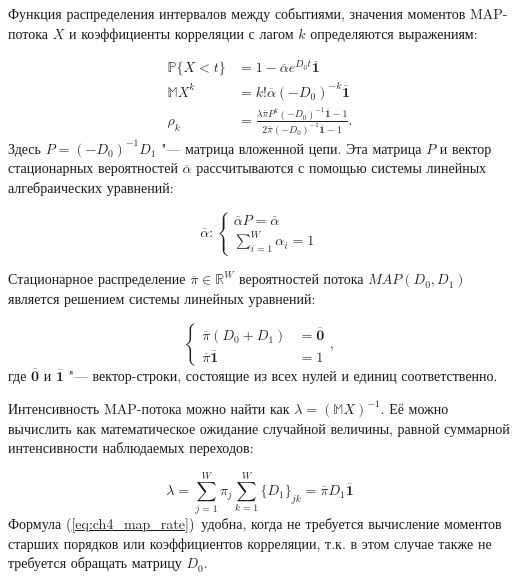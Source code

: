 Функция распределения интервалов между событиями, значения моментов MAP-потока $X$ и коэффициенты корреляции с лагом $k$ определяются выражениям:

\begin{equation}
	\label{eq:ch4_map_props}
    \begin{aligned}
    \mathbb{P}\{X < t\} &= 1 - \overline{\alpha}e^{D_0 t}\overline{\mathbf{1}}\\
    \mathbb{M}X^{k} &= k! \overline{\alpha}(-D_0)^{-k}\overline{\mathbf{1}}\\
    \rho_k &= \frac{\lambda \overline{\pi} P^k (-D_0)^{-1} \overline{\mathbf{1}} - 1}{2 \overline{\pi} (-D_0)^{-1} \overline{\mathbf{1}} - 1}.
    \end{aligned}
\end{equation}
Здесь $P = (-D_0)^{-1} D_1$ "--- матрица вложенной цепи. Эта матрица $P$ и вектор стационарных вероятностей $\overline{\alpha}$ рассчитываются с помощью системы линейных алгебраических уравнений:

\begin{equation}
\label{eq:ch4_map_dtmc}
	\overline{\alpha}: \begin{cases}
		\overline{\alpha} P = \overline{\alpha} \\
		\sum\limits_{i=1}^{W} \alpha_i = 1
 	\end{cases}
\end{equation}

Стационарное распределение $\overline{\pi} \in \mathbb{R}^W$ вероятностей потока $MAP(D_0, D_1)$ является решением системы линейных уравнений:

\begin{equation}
	\label{eq:ch4_map_pmf}
	\begin{cases}
		\overline{\pi}(D_0 + D_1) &= \overline{\mathbf{0}}\\
		\overline{\pi}\overline{\mathbf{1}} &= 1
	\end{cases},
\end{equation}
где $\overline{\mathbf{0}}$ и $\overline{\mathbf{1}}$ "--- вектор-строки, состоящие из всех нулей и единиц соответственно.

Интенсивность MAP-потока можно найти как $\lambda = (\mathbb{M}X)^{-1}$. Её можно вычислить как математическое ожидание случайной величины, равной суммарной интенсивности наблюдаемых переходов:

\begin{equation}
	\label{eq:ch4_map_rate}
	\lambda = \sum\limits_{j=1}^{W} \pi_j \sum\limits_{k=1}^{W} \{D_1\}_{jk} = \overline{\pi} D_1 \overline{\mathbf{1}}
\end{equation}
Формула (\ref{eq:ch4_map_rate})~удобна, когда не требуется вычисление моментов старших порядков или коэффициентов корреляции, т.к. в этом случае также не требуется обращать матрицу $D_0$.

